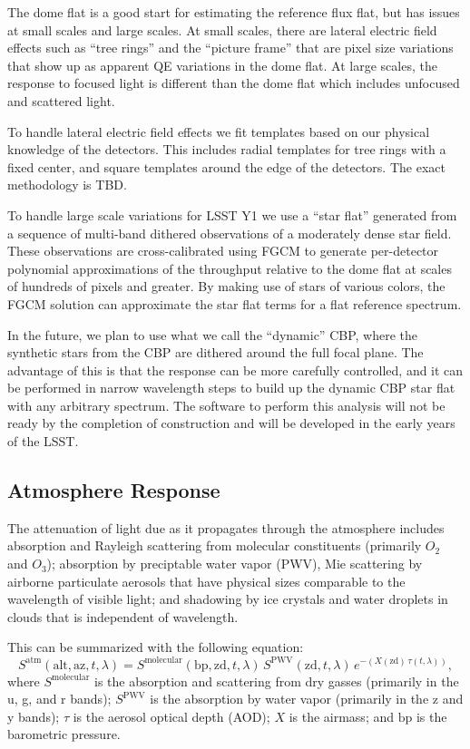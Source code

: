 \documentclass[SE,authoryear,lsstdraft,toc]{lsstdoc}
\begin{document}
The dome flat is a good start for estimating the reference flux flat, but has
issues at small scales and large scales.  At small scales, there are lateral
electric field effects such as ``tree rings'' and the ``picture frame'' that
are pixel size variations that show up as apparent QE variations in the dome
flat.  At large scales, the response to focused light is different than the
dome flat which includes unfocused and scattered light.

To handle lateral electric field effects we fit templates based on our physical
knowledge of the detectors.  This includes radial templates for tree rings with
a fixed center, and square templates around the edge of the detectors.  The
exact methodology is TBD.

To handle large scale variations for LSST Y1 we use a ``star flat'' generated
from a sequence of multi-band dithered observations of a moderately dense star
field.  These observations are cross-calibrated using FGCM to generate
per-detector polynomial approximations of the throughput relative to the dome
flat at scales of hundreds of pixels and greater.  By making use of stars of
various colors, the FGCM solution can approximate the star flat terms for a
flat reference spectrum.

In the future, we plan to use what we call the ``dynamic'' CBP, where the
synthetic stars from the CBP are dithered around the full focal plane.  The
advantage of this is that the response can be more carefully controlled, and it
can be performed in narrow wavelength steps to build up the dynamic CBP star
flat with any arbitrary spectrum.  The software to perform this analysis will
not be ready by the completion of construction and will be developed in the
early years of the LSST.

\subsection{Atmosphere Response}

The attenuation of light due as it propagates through the atmosphere includes
absorption and Rayleigh scattering from molecular constituents (primarily $O_2$
and $O_3$); absorption by preciptable water vapor (PWV), Mie scattering by
airborne particulate aerosols that have physical sizes comparable to the
wavelength of visible light; and shadowing by ice crystals and water droplets
in clouds that is independent of wavelength.

This can be summarized with the following equation:
%
\begin{equation}
S^{\mathrm{atm}}(\mathrm{alt}, \mathrm{az}, t, \lambda) =
S^{\mathrm{molecular}}(\mathrm{bp}, \mathrm{zd}, t,
\lambda)\,S^{\mathrm{PWV}}(\mathrm{zd}, t,
\lambda)\,e^{-(X(\mathrm{zd})\,\tau(t, \lambda))},
\end{equation}
%
where $S^{\mathrm{molecular}}$ is the absorption and scattering from dry gasses
(primarily in the u, g, and r bands); $S^{\mathrm{PWV}}$ is the absorption by
water vapor (primarily in the z and y bands); $\tau$ is the aerosol optical
depth (AOD); $X$ is the airmass; and $\mathrm{bp}$ is the barometric pressure.
\end{document}
